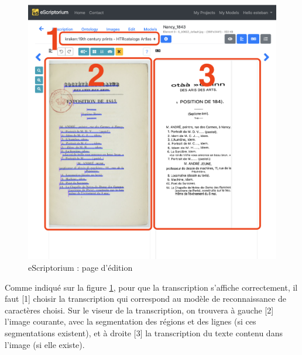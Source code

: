 \documentclass[a4paper,12pt,twoside]{book}
\begin{document}
\begin{figure}[ht]
	\centering
	\includegraphics[scale=0.3]{editer_eScriptorium.png}		
	\caption{eScriptorium : page d'édition}
	\label{pageedition}
\end{figure}
Comme indiqué sur la figure \ref{pageedition}, pour que la transcription s'affiche correctement, il faut [1] choisir la transcription qui correspond au modèle de reconnaissance de caractères choisi. Sur le viseur de la transcription, on trouvera à gauche [2] l'image courante, avec la segmentation des régions et des lignes (si ces segmentations existent), et à droite [3] la transcription du texte contenu dans l'image (si elle existe). 
\end{document}
